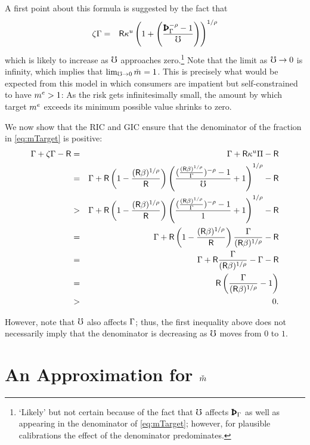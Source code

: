 \documentclass{handout}
\begin{document}
A first point about this formula is suggested by the fact that
\begin{eqnarray}
  \zeta\PGro & = & \Rfree \MPCU \left(1+\left(\frac{\PatPGro^{-\CRRA} - 1}{\urate}\right)\right)^{1/\CRRA}
\end{eqnarray}
which is likely to increase as $\mho$ approaches zero.\footnote{`Likely' but not certain because of the fact that $\mho$ affects $\PatPGro$ as well as
  appearing in the denominator of \eqref{eq:mTarget}; however, for
  plausible calibrations the effect of the denominator predominates.}
Note that the limit as $\mho \rightarrow 0$ is infinity, which
implies that $\lim_{\urate \rightarrow
  0} \mTarg^{\null} = 1$.  This is precisely what would be expected from
this model in which consumers are impatient but self-constrained to
have $m^{e} > 1$:  As the risk gets infinitesimally small, the
amount by which target $m^{e}$ exceeds its minimum possible value shrinks to
zero.

We now show that the RIC and GIC ensure that the denominator of the fraction in \eqref{eq:mTarget} is positive:
\begin{eqnarray}
\Gamma + \zeta \Gamma - \mathsf{R} & = & \Gamma + \mathsf{R} \kappa^{u} \Pi - \mathsf{R}
 \\& = & \Gamma + \mathsf{R} \left(1- \frac{(\mathsf{R} \beta)^{1/\rho}}{\mathsf{R}}\right) \left(\frac{(\frac{(\mathsf{R}\beta)^{1/\rho}}{\Gamma})^{-\rho}-1}{\mho}+1\right)^{1/\rho}-\mathsf{R}
 \\& > &  \Gamma+\mathsf{R} \left(1-\frac{(\mathsf{R}\beta)^{1/\rho}}{\mathsf{R}}\right)
\left(\frac{(\frac{(\mathsf{R}\beta)^{1/\rho}}{\Gamma})^{-\rho}-1}{1}+1\right)^{1/\rho}-\mathsf{R}
 \\& = & \Gamma+\mathsf{R}\left(1-\frac{(\mathsf{R}\beta)^{1/\rho}}{\mathsf{R}}\right)\frac{\Gamma}{(\mathsf{R}\beta)^{1/\rho}}-\mathsf{R}
 \\& = & \Gamma+\mathsf{R} \frac{\Gamma}{(\mathsf{R}\beta)^{1/\rho}}- \Gamma - \mathsf{R}
 \\& = & \mathsf{R} \left(\frac{\Gamma}{(\mathsf{R}\beta)^{1/\rho}}-1\right)
 \\& > & 0.
\end{eqnarray}

However, note that $\mho$ also affects $\Gamma$; thus, the first inequality above does
not necessarily imply that the denominator is decreasing as $\mho$ moves from $0$ to $1$.


\section{An Approximation for $\mTarg^{\null}$}
\end{document}
